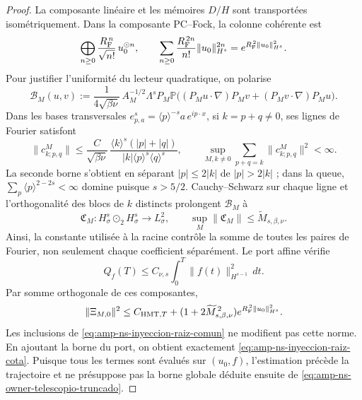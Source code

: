 \begin{proof}
La composante linéaire et les mémoires \(D/H\) sont transportées isométriquement. Dans la composante PC--Fock, la colonne cohérente est
\[
 \bigoplus_{n\geq0}
 \frac{R_{\rm F}^{\,n}}{\sqrt{n!}}\,u_0^{\odot n},
 \qquad
 \sum_{n\geq0}\frac{R_{\rm F}^{\,2n}}{n!}
       \|u_0\|_{H^s}^{2n}
 =e^{R_{\rm F}^{\,2}\|u_0\|_{H^s}^2}.
\]
Pour justifier l'uniformité du lecteur quadratique, on polarise
\begin{equation}\label{eq:amp-ns-lector-cuadratico-polarizado}
 \mathcal B_M(u,v):=
 \frac{1}{4\sqrt{\beta\nu}}\,
 A_M^{-1/2}\Lambda^sP_M\mathbb P
 \bigl((P_Mu\!\cdot\!\nabla)P_Mv
      +(P_Mv\!\cdot\!\nabla)P_Mu\bigr).
\end{equation}
Dans les bases transversales \(e^s_{p,a}=\langle p\rangle^{-s}a\,e^{ip\cdot x}\), si \(k=p+q\ne0\), ses lignes de Fourier satisfont
\begin{equation}\label{eq:amp-ns-filas-fourier-uniformes}
 \|c^M_{k;p,q}\|
 \leq\frac{C}{\sqrt{\beta\nu}}\,
 \frac{\langle k\rangle^s(|p|+|q|)}
 {|k|\langle p\rangle^s\langle q\rangle^s},
 \qquad
 \sup_{M,k\ne0}\sum_{p+q=k}\|c^M_{k;p,q}\|^2<\infty .
\end{equation}
La seconde borne s'obtient en séparant \(|p|\leq2|k|\) de \(|p|>2|k|\) ; dans la queue, \(\sum_p\langle p\rangle^{2-2s}<\infty\) domine puisque \(s>5/2\). Cauchy--Schwarz sur chaque ligne et l'orthogonalité des blocs de \(k\) distincts prolongent \(\mathcal B_M\) à
\[
 \mathfrak C_M:H^s_\sigma\odot_2H^s_\sigma\longrightarrow L^2_\sigma,
 \qquad
 \sup_M\|\mathfrak C_M\|
 \leq\widetilde M_{s,\beta,\nu}.
\]
Ainsi, la constante utilisée à la racine contrôle la somme de toutes les paires de Fourier, non seulement chaque coefficient séparément. Le port affine vérifie
\[
 Q_f(T)\leq C_{\nu,s}
 \int_0^T\|f(t)\|_{H^{s-1}}^2\,dt .
\]
Par somme orthogonale de ces composantes,
\begin{equation}\label{eq:amp-ns-raiz-cota-por-componentes}
 \|\Xi_{M,0}\|^2
 \leq C_{{\rm HMT},T}
 +(1+2\widetilde M_{s,\beta,\nu}^{\,2})
 e^{R_{\rm F}^{\,2}\|u_0\|_{H^s}^2}.
\end{equation}
Les inclusions de \eqref{eq:amp-ns-inyeccion-raiz-comun} ne modifient pas cette norme. En ajoutant la borne du port, on obtient exactement \eqref{eq:amp-ns-inyeccion-raiz-cota}. Puisque tous les termes sont évalués sur \((u_0,f)\), l'estimation précède la trajectoire et ne présuppose pas la borne globale déduite ensuite de \eqref{eq:amp-ns-owner-telescopio-truncado}.
\end{proof}

